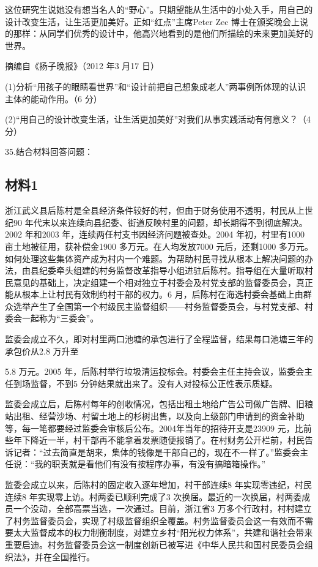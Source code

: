 \documentclass[UTF8,11pt]{ctexart}
\begin{document}
这位研究生说她没有想当名人的“野心”。只期望能从生活中的小处入手，用自己的设计改变生活，让生活更加美好。正如“红点”主席Peter Zec 博士在颁奖晚会上说的那样：从同学们优秀的设计中，他高兴地看到的是他们所描绘的未来更加美好的世界。

摘编自《扬子晚报》（2012 年3 月17 日）


(1)分析“用孩子的眼睛看世界”和“设计前把自己想象成老人”两事例所体现的认识主体的能动作用。（6 分）


(2)“用自己的设计改变生活，让生活更加美好”对我们从事实践活动有何意义？（4 分）


35.结合材料回答问题：


\subsection*{材料1}

浙江武义县后陈村是全县经济条件较好的村，但由于财务使用不透明，村民从上世纪90 年代末以来连续向县纪委、街道反映村里的问题，却长期得不到彻底解决。2002 年和2003 年，连续两任村支书因经济问题被查处。2004 年初，村里有1000 亩土地被征用，获补偿金1900 多万元。在人均发放7000 元后，还剩1000 多万元。如何处理这些集体资产成为村内一个难题。为帮助村民寻找从根本上解决问题的办法，由县纪委牵头组建的村务监督改革指导小组进驻后陈村。指导组在大量听取村民意见的基础上，决定组建一个相对独立于村委会及村党支部的监督委员会，真正能从根本上让村民有效制约村干部的权力。6 月，后陈村在海选村委会基础上由群众选举产生了全国第一个村级民主监督组织——村务监督委员会，与村党支部、村委会一起称为“三委会”。

监委会成立不久，即对村里两口池塘的承包进行了全程监督，结果每口池塘三年的承包价从2.8 万升至

5.8 万元。2005 年，后陈村举行垃圾清运投标会。村委会主任主持会议，监委会主任到场监督，不到5 分钟结果就出来了。没有人对投标公正性表示质疑。

监委会成立后，后陈村每年的创收情况，包括出租土地给广告公司做广告牌、旧粮站出租、经营沙场、村留土地上的杉树出售，以及向上级部门申请到的资金补助等，每一笔都要经过监委会审核后公布。2004年当年的招待开支是23909 元，比前些年下降近一半，村干部再不能拿着发票随便报销了。在村财务公开栏前，村民告诉记者：“过去简直是胡来，集体的钱像是干部自己的，现在不一样了。”监委会主任说：“我的职责就是看他们有没有按程序办事，有没有搞暗箱操作。”

监委会成立以来，后陈村的固定收入逐年增加，村干部连续8 年实现零违纪，村民连续8 年实现零上访。村两委已顺利完成了3 次换届。最近的一次换届，村两委成员一个没动，全部高票当选，一次通过。目前，浙江省3 万多个行政村，村村建立了村务监督委员会，实现了村级监督组织全覆盖。村务监督委员会这一有效而不需要太大监督成本的权力制衡制度，对建立乡村“阳光权力体系”，共建和谐社会带来重要启迪。村务监督委员会这一制度创新已被写进《中华人民共和国村民委员会组织法》，并在全国推行。
\end{document}
